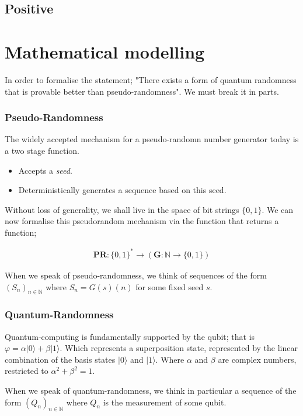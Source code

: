 \documentclass{article}
\begin{document}
\subsection*{Positive}

\pagebreak
\section*{Mathematical modelling}
In order to formalise the statement; "There exists a form of quantum randomness that is provable better than pseudo-randomness". We must break it in parts.

\subsubsection*{Pseudo-Randomness}
The widely accepted mechanism for a pseudo-randomn number generator today is a two stage function.

\begin{itemize}
	\item{Accepts a \emph{seed}.}
	\item{Deterministically generates a sequence based on this seed.}
\end{itemize}

Without loss of generality, we shall live in the space of bit strings $\{0, 1\}$. We can now formalise this pseudorandom mechanism via the function that returns a function;

\begin{align*}
	\bm{PR}: \{0,1\}^* \rightarrow (\bm{G}: \mathbb{N} \rightarrow \{0,1\})
\end{align*}

When we speak of pseudo-randomness, we think of sequences of the form $(S_n)_{n \in \mathbb{N}}$ where $S_n = G(s)(n)$ for some fixed seed $s$.

\subsubsection*{Quantum-Randomness}
Quantum-computing is fundamentally supported by the qubit; that is $\varphi = \alpha | 0\rangle + \beta | 1\rangle$. Which represents a superposition state, represented by the linear combination of the basis states $| 0\rangle$ and $| 1\rangle$. Where $\alpha$ and $\beta$ are complex numbers, restricted to $\alpha^2 + \beta^2 = 1$. 

When we speak of quantum-randomness, we think in particular a sequence of the form $(Q_n)_{n \in \mathbb{N}}$ where $Q_n$ is the measurement of some qubit.
\end{document}
